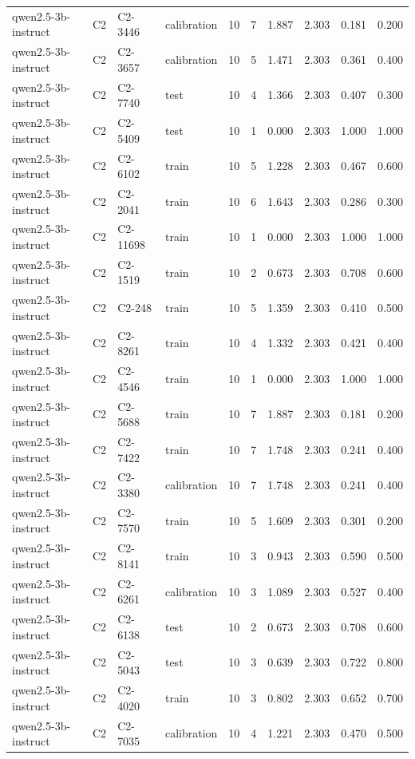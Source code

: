 \begin{table}
\begin{tabular}{llllrrrrrr}
qwen2.5-3b-instruct & C2 & C2-3446 & calibration & 10 & 7 & 1.887 & 2.303 & 0.181 & 0.200 \\
qwen2.5-3b-instruct & C2 & C2-3657 & calibration & 10 & 5 & 1.471 & 2.303 & 0.361 & 0.400 \\
qwen2.5-3b-instruct & C2 & C2-7740 & test & 10 & 4 & 1.366 & 2.303 & 0.407 & 0.300 \\
qwen2.5-3b-instruct & C2 & C2-5409 & test & 10 & 1 & 0.000 & 2.303 & 1.000 & 1.000 \\
qwen2.5-3b-instruct & C2 & C2-6102 & train & 10 & 5 & 1.228 & 2.303 & 0.467 & 0.600 \\
qwen2.5-3b-instruct & C2 & C2-2041 & train & 10 & 6 & 1.643 & 2.303 & 0.286 & 0.300 \\
qwen2.5-3b-instruct & C2 & C2-11698 & train & 10 & 1 & 0.000 & 2.303 & 1.000 & 1.000 \\
qwen2.5-3b-instruct & C2 & C2-1519 & train & 10 & 2 & 0.673 & 2.303 & 0.708 & 0.600 \\
qwen2.5-3b-instruct & C2 & C2-248 & train & 10 & 5 & 1.359 & 2.303 & 0.410 & 0.500 \\
qwen2.5-3b-instruct & C2 & C2-8261 & train & 10 & 4 & 1.332 & 2.303 & 0.421 & 0.400 \\
qwen2.5-3b-instruct & C2 & C2-4546 & train & 10 & 1 & 0.000 & 2.303 & 1.000 & 1.000 \\
qwen2.5-3b-instruct & C2 & C2-5688 & train & 10 & 7 & 1.887 & 2.303 & 0.181 & 0.200 \\
qwen2.5-3b-instruct & C2 & C2-7422 & train & 10 & 7 & 1.748 & 2.303 & 0.241 & 0.400 \\
qwen2.5-3b-instruct & C2 & C2-3380 & calibration & 10 & 7 & 1.748 & 2.303 & 0.241 & 0.400 \\
qwen2.5-3b-instruct & C2 & C2-7570 & train & 10 & 5 & 1.609 & 2.303 & 0.301 & 0.200 \\
qwen2.5-3b-instruct & C2 & C2-8141 & train & 10 & 3 & 0.943 & 2.303 & 0.590 & 0.500 \\
qwen2.5-3b-instruct & C2 & C2-6261 & calibration & 10 & 3 & 1.089 & 2.303 & 0.527 & 0.400 \\
qwen2.5-3b-instruct & C2 & C2-6138 & test & 10 & 2 & 0.673 & 2.303 & 0.708 & 0.600 \\
qwen2.5-3b-instruct & C2 & C2-5043 & test & 10 & 3 & 0.639 & 2.303 & 0.722 & 0.800 \\
qwen2.5-3b-instruct & C2 & C2-4020 & train & 10 & 3 & 0.802 & 2.303 & 0.652 & 0.700 \\
qwen2.5-3b-instruct & C2 & C2-7035 & calibration & 10 & 4 & 1.221 & 2.303 & 0.470 & 0.500 \\

\end{tabular}
\end{table}

